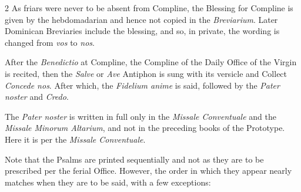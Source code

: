 \begin{multicols}{2}
As friars were never to be absent from Compline, the Blessing for Compline is given by the hebdomadarian and hence not copied in the \emph{Breviarium}. Later Dominican Breviaries include the blessing, and so, in private, the wording is changed from \emph{vos} to \emph{nos}.

After the \emph{Benedictio} at Compline, the Compline of the Daily Office of the Virgin is recited, then the \emph{Salve} or \emph{Ave} Antiphon is sung with its versicle and Collect \emph{Concede nos}. After which, the \emph{Fidelium anime} is said, followed by the \emph{Pater noster} and \emph{Credo}.


The \emph{Pater noster} is written in full only in the \emph{Missale Conventuale} and the \emph{Missale Minorum Altarium}, and not in the preceding books of the Prototype. Here it is per the \emph{Missale Conventuale}.






Note that the Psalms are printed sequentially and not as they are to be prescribed per the ferial Office. However, the order in which they appear nearly matches when they are to be said, with a few exceptions:


\end{multicols}
